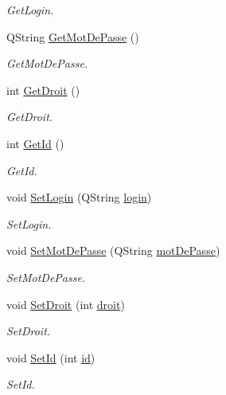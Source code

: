 \begin{DoxyCompactItemize}
\begin{DoxyCompactList}\small\item\em Get\+Login. \end{DoxyCompactList}\item 
Q\+String \mbox{\hyperlink{class_utilisateur_ad558f2e85090c4660e97e6de6f8d1567}{Get\+Mot\+De\+Passe}} ()
\begin{DoxyCompactList}\small\item\em Get\+Mot\+De\+Passe. \end{DoxyCompactList}\item 
int \mbox{\hyperlink{class_utilisateur_aa5e86f36e1b94dc3cce6393205c0a8cf}{Get\+Droit}} ()
\begin{DoxyCompactList}\small\item\em Get\+Droit. \end{DoxyCompactList}\item 
int \mbox{\hyperlink{class_utilisateur_a6cb20ba5bcbb83792e31f8a913178534}{Get\+Id}} ()
\begin{DoxyCompactList}\small\item\em Get\+Id. \end{DoxyCompactList}\item 
void \mbox{\hyperlink{class_utilisateur_a0bf37c85322764c3b094acd66aacec64}{Set\+Login}} (Q\+String \mbox{\hyperlink{class_utilisateur_abb16ed370d845def5c476b79ea415dba}{login}})
\begin{DoxyCompactList}\small\item\em Set\+Login. \end{DoxyCompactList}\item 
void \mbox{\hyperlink{class_utilisateur_a64504a89dd26ab7529305ea8d98460e5}{Set\+Mot\+De\+Passe}} (Q\+String \mbox{\hyperlink{class_utilisateur_a4f6a17d0fb5c231bcb414396236a056f}{mot\+De\+Passe}})
\begin{DoxyCompactList}\small\item\em Set\+Mot\+De\+Passe. \end{DoxyCompactList}\item 
void \mbox{\hyperlink{class_utilisateur_ab1d22e4a620262b9ea352b53872d855c}{Set\+Droit}} (int \mbox{\hyperlink{class_utilisateur_ac4f7dfce4243768a6eabfbb57b883cdf}{droit}})
\begin{DoxyCompactList}\small\item\em Set\+Droit. \end{DoxyCompactList}\item 
void \mbox{\hyperlink{class_utilisateur_a583802b49a289114a47911a4ac98158d}{Set\+Id}} (int \mbox{\hyperlink{class_utilisateur_a600c54bc097070179b64008dd98bdebb}{id}})
\begin{DoxyCompactList}\small\item\em Set\+Id. \end{DoxyCompactList}\end{DoxyCompactItemize}

